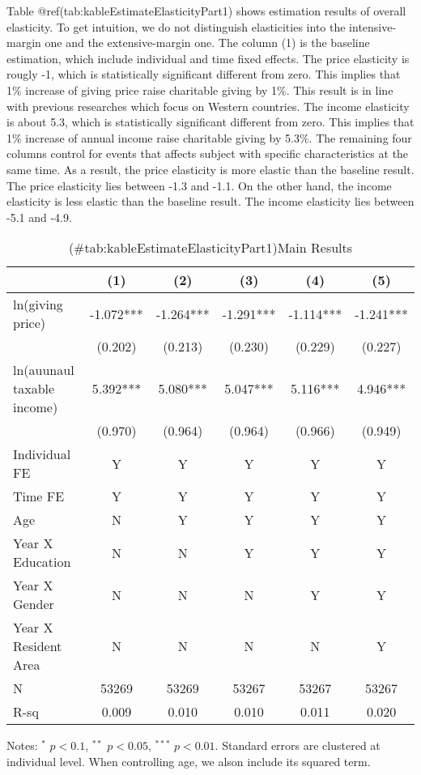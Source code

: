 \documentclass[
]{article}
\begin{document}
Table @ref(tab:kableEstimateElasticityPart1) shows estimation results of overall elasticity.
To get intuition, we do not distinguish elasticities into the intensive-margin one and the extensive-margin one.
The column (1) is the baseline estimation, which include individual and time fixed effects.
The price elasticity is rougly -1, which is statistically significant different from zero.
This implies that 1\% increase of giving price raise charitable giving by 1\%.
This result is in line with previous researches which focus on Western countries.
The income elasticity is about 5.3, which is statistically significant different from zero.
This implies that 1\% increase of annual income raise charitable giving by 5.3\%.
The remaining four columns control for events that affects subject with specific characteristics at the same time.
As a result, the price elasticity is more elastic than the baseline result.
The price elasticity lies between -1.3 and -1.1.
On the other hand, the income elasticity is less elastic than the baseline result.
The income elasticity lies between -5.1 and -4.9.

\begin{table}

\caption{(\#tab:kableEstimateElasticityPart1)Main Results}
\centering
\fontsize{7}{9}\selectfont
\begin{threeparttable}
\begin{tabular}[t]{lccccc}
\toprule
 & (1) & (2) & (3) & (4) & (5)\\
\midrule
ln(giving price) & -1.072*** & -1.264*** & -1.291*** & -1.114*** & -1.241***\\
 & (0.202) & (0.213) & (0.230) & (0.229) & (0.227)\\
ln(auunaul taxable income) & 5.392*** & 5.080*** & 5.047*** & 5.116*** & 4.946***\\
 & (0.970) & (0.964) & (0.964) & (0.966) & (0.949)\\
Individual FE & Y & Y & Y & Y & Y\\
Time FE & Y & Y & Y & Y & Y\\
Age & N & Y & Y & Y & Y\\
Year X Education & N & N & Y & Y & Y\\
Year X Gender & N & N & N & Y & Y\\
Year X Resident Area & N & N & N & N & Y\\
N & 53269 & 53269 & 53267 & 53267 & 53267\\
R-sq & 0.009 & 0.010 & 0.010 & 0.011 & 0.020\\
\bottomrule
\end{tabular}
\begin{tablenotes}
\item Notes: $^{*}$ $p < 0.1$, $^{**}$ $p < 0.05$, $^{***}$ $p < 0.01$. Standard errors are clustered at individual level. When controlling age, we alson include its squared term.
\end{tablenotes}
\end{threeparttable}
\end{table}
\end{document}
